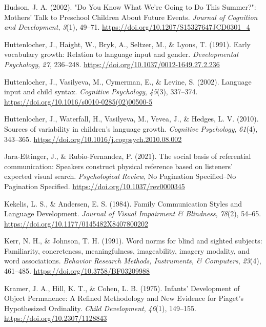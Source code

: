 \documentclass[
  man,floatsintext]{apa6}
\newlength{\cslhangindent}
\newlength{\cslentryspacingunit} %
\newenvironment{CSLReferences}[2] %
 {%
  \setlength{\parindent}{0pt}
  \ifodd #1
  \let\oldpar\par
  \def\par{\hangindent=\cslhangindent\oldpar}
  \fi
  \setlength{\parskip}{#2\cslentryspacingunit}
 }%
 {}
\begin{document}
\begin{CSLReferences}{1}{0}
\leavevmode{}%
Hudson, J. A. (2002). "{Do You Know What We}'re {Going} to {Do This Summer}?": {Mothers}' {Talk} to {Preschool Children About Future Events}. \emph{Journal of Cognition and Development}, \emph{3}(1), 49--71. \url{https://doi.org/10.1207/S15327647JCD0301_4}

\leavevmode{}%
Huttenlocher, J., Haight, W., Bryk, A., Seltzer, M., \& Lyons, T. (1991). Early vocabulary growth: {Relation} to language input and gender. \emph{Developmental Psychology}, \emph{27}, 236--248. \url{https://doi.org/10.1037/0012-1649.27.2.236}

\leavevmode{}%
Huttenlocher, J., Vasilyeva, M., Cymerman, E., \& Levine, S. (2002). Language input and child syntax. \emph{Cognitive Psychology}, \emph{45}(3), 337--374. \url{https://doi.org/10.1016/s0010-0285(02)00500-5}

\leavevmode{}%
Huttenlocher, J., Waterfall, H., Vasilyeva, M., Vevea, J., \& Hedges, L. V. (2010). Sources of variability in children's language growth. \emph{Cognitive Psychology}, \emph{61}(4), 343--365. \url{https://doi.org/10.1016/j.cogpsych.2010.08.002}

\leavevmode{}%
Jara-Ettinger, J., \& Rubio-Fernandez, P. (2021). The social basis of referential communication: {Speakers} construct physical reference based on listeners' expected visual search. \emph{Psychological Review}, No Pagination Specified--No Pagination Specified. \url{https://doi.org/10.1037/rev0000345}

\leavevmode{}%
Kekelis, L. S., \& Andersen, E. S. (1984). Family {Communication Styles} and {Language Development}. \emph{Journal of Visual Impairment \& Blindness}, \emph{78}(2), 54--65. \url{https://doi.org/10.1177/0145482X8407800202}

\leavevmode{}%
Kerr, N. H., \& Johnson, T. H. (1991). Word norms for blind and sighted subjects: {Familiarity}, concreteness, meaningfulness, imageability, imagery modality, and word associations. \emph{Behavior Research Methods, Instruments, \& Computers}, \emph{23}(4), 461--485. \url{https://doi.org/10.3758/BF03209988}

\leavevmode{}%
Kramer, J. A., Hill, K. T., \& Cohen, L. B. (1975). Infants' {Development} of {Object Permanence}: {A Refined Methodology} and {New Evidence} for {Piaget}'s {Hypothesized Ordinality}. \emph{Child Development}, \emph{46}(1), 149--155. \url{https://doi.org/10.2307/1128843}


\end{CSLReferences}
\end{document}
